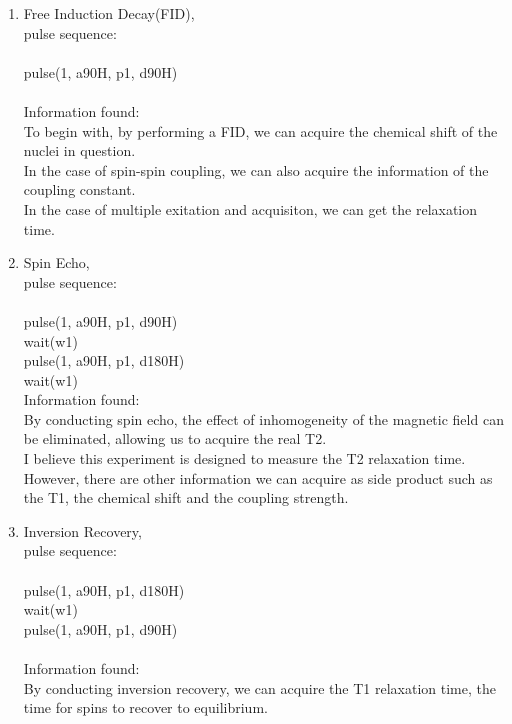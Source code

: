 \documentclass[11pt]{article}
\begin{document}
\begin{enumerate}[label=(\alph*)]
    \item Free Induction Decay(FID),\\
    pulse sequence: \\
    \\
    pulse(1, a90H, p1, d90H)\\
    \\
    Information found:\\
    To begin with, by performing a FID, we can acquire the chemical shift of the nuclei in question.\\ In the case of spin-spin coupling, we can also acquire the information of the coupling constant.\\ In the case of multiple exitation and acquisiton, we can get the relaxation time.\\
    \item Spin Echo,\\
    pulse sequence: \\
    \\
    pulse(1, a90H, p1, d90H)\\
    wait(w1)\\
    pulse(1, a90H, p1, d180H)\\
    wait(w1)
    \\
    Information found:\\
    By conducting spin echo, the effect of inhomogeneity of the magnetic field can be eliminated, allowing us to acquire the real T2.\\
    I believe this experiment is designed to measure the T2 relaxation time. However, there are other information we can acquire as side product such as the T1, the chemical shift and the coupling strength.\\    
    \item Inversion Recovery,\\
    pulse sequence: \\
    \\
    pulse(1, a90H, p1, d180H)\\
    wait(w1)\\
    pulse(1, a90H, p1, d90H)\\
    \\
    Information found:\\
    By conducting inversion recovery, we can acquire the T1 relaxation time, the time for spins to recover to equilibrium.\\
\end{enumerate}
\end{document}
